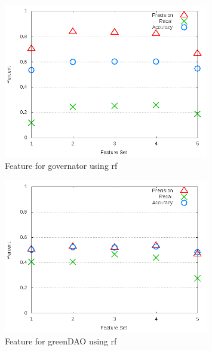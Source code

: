 \begin{figure}[!t]
\centering
\includegraphics[width=0.8\textwidth]{images/rf/test_3/governator_sample_range.png}
\caption{Feature for governator using \gls{rf}}
\label{fig:test_3_governator_rf}
\end{figure}

\begin{figure}[!t]
\centering
\includegraphics[width=0.8\textwidth]{images/rf/test_3/greenDAO_sample_range.png}
\caption{Feature for greenDAO using \gls{rf}}
\label{fig:test_3_greenDAO_rf}
\end{figure}

